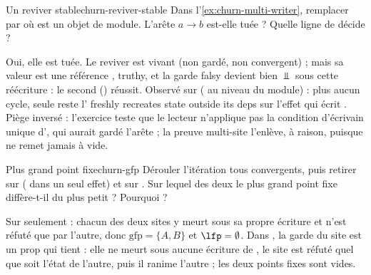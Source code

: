 \begin{exercice}{Un reviver stable}{churn-reviver-stable}
Dans l'\cref{ex:churn-multi-writer}, remplacer  par 
où  est un objet de module. L'arête $a \to b$ est-elle tuée ? Quelle ligne de
 décide ?
\end{exercice}
\begin{solution}
Oui, elle est tuée. Le reviver est vivant (non gardé, non convergent) ; mais sa valeur est
une référence , truthy, et la garde \og {} falsy\fg{} devient bien $\Bot$
sous cette réécriture : le second 
() réussit. Observé sur 
( au niveau du module) : plus aucun cycle, seule
reste l'\Info{} \og freshly recreates state  outside its deps\fg{} sur l'effet
qui écrit . Piège inversé : l'exercice teste que le lecteur
n'applique pas la condition d'écrivain unique d', qui aurait gardé l'arête ; la
preuve multi-site l'enlève, à raison, puisque  ne remet jamais  à vide.
\end{solution}

\begin{exercice}{Plus grand point fixe}{churn-gfp}
Dérouler l'itération \og tous convergents, puis retirer\fg{} sur 
( dans un seul effet) et sur
. Sur lequel des deux le plus grand point fixe diffère-t-il du plus
petit ? Pourquoi ?
\end{exercice}
\begin{solution}
Sur  seulement : chacun des deux sites y meurt sous sa propre
écriture et n'est réfuté que par l'autre, donc $\mathrm{gfp} = \{A, B\}$ et
$\lfp = \emptyset$. Dans , la garde  du site
 est un prop qui tient : elle ne meurt sous aucune écriture de ,
le site est réfuté quel que soit l'état de l'autre, puis il ranime l'autre ; les deux
points fixes sont vides.
\end{solution}

